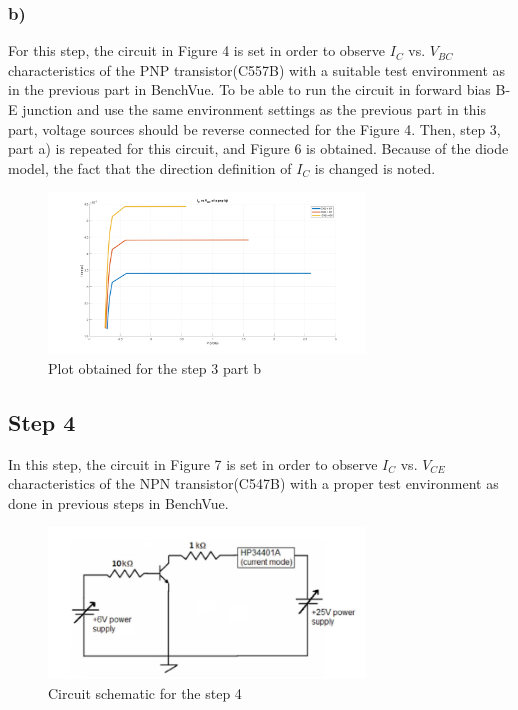 \documentclass[letterpaper,12pt]{article}
\begin{document}
\subsubsection{b)}
For this step, the circuit in Figure 4 is set in order to observe \(I_C\) vs. \(V_{BC}\) characteristics of the PNP transistor(C557B) with a suitable test environment as in the previous part in BenchVue. To be able to run the circuit in forward bias B-E junction and use the same environment settings as the previous part in this part, voltage sources should be reverse connected for the Figure 4. Then, step 3, part a) is repeated for this circuit, and Figure 6 is obtained. Because of the diode model, the fact that the direction definition of \(I_C\) is changed is noted. 
\begin{figure}[H]
    \centering
    \includegraphics[width = 0.75\textwidth]{3_2.png}
    \caption{Plot obtained for the step 3 part b}
    \end{figure} 
\subsection{Step 4}
In this step, the circuit in Figure 7 is set in order to observe \(I_C\) vs. \(V_{CE}\) characteristics of the NPN transistor(C547B) with a proper test environment as done in previous steps in BenchVue. 

\begin{figure}[H]
    \centering
    \includegraphics[width = 0.75\textwidth]{step4.png}
    \caption{Circuit schematic for the step 4}
    \end{figure} 
\end{document}
